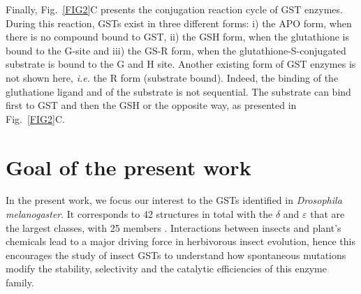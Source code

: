 Finally, Fig.~\ref{FIG2}C presents the conjugation reaction cycle of GST enzymes. During this reaction, GSTs exist in three different forms: i) the APO form, when there is no compound bound to GST, ii) the GSH form, when the glutathione is bound to the G-site and iii) the GS-R form, when the glutathione-S-conjugated substrate is bound to the G and H site. Another existing form of GST enzymes is not shown here, \textit{i.e.} the R form (substrate bound). Indeed, the binding of the gluthatione ligand and of the substrate is not sequential. The substrate can bind first to GST and then the GSH or the opposite way, as presented in Fig.~\ref{FIG2}C. 

\section{Goal of the present work}

In the present work, we focus our interest to the GSTs identified in \textit{Drosophila melanogaster}. It corresponds to 42 structures in total with the $\delta$ and $\varepsilon$ that are the largest classes, with 25 members \cite{F-Neiers-GSTs}. Interactions between insects and plant’s chemicals lead to a major driving force in herbivorous insect evolution, hence this encourages the study of insect GSTs to understand how spontaneous mutations modify the stability, selectivity and the catalytic efficiencies of this enzyme family.
